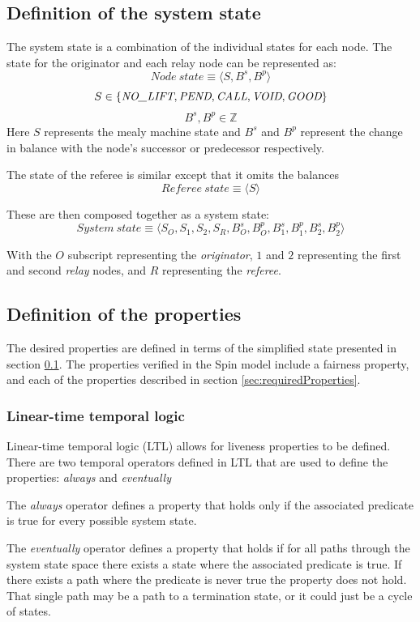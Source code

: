 \documentclass[runningheads]{llncs}
\newcommand{\nolift}{\emph{NO\_LIFT}}
\newcommand{\pend}{\emph{PEND}}
\newcommand{\call}{\emph{CALL}}
\newcommand{\void}{\emph{VOID}}
\newcommand{\good}{\emph{GOOD}}
\begin{document}
\subsection{Definition of the system state}\label{sec:statedef}
The system state is a combination of the individual states for each node. The state for the originator and each relay node can be represented as:
$$Node~state \equiv \langle S, B^s, B^p \rangle$$
$$
S \in \{\nolift, \pend, \call, \void, \good\}
$$
$$
B^s, B^p \in \mathds{Z}
$$
Here $S$ represents the mealy machine state and $B^s$ and $B^p$ represent the change in balance with the node's successor or predecessor respectively.

The state of the referee is similar except that it omits the balances
$$Referee~state \equiv \langle S \rangle$$

These are then composed together as a system state:
$$System~state \equiv \langle S_O, S_1, S_2, S_R, B^s_O, B^p_O, B^s_1, B^p_1, B^s_2, B^p_2  \rangle$$

With the $O$ subscript representing the \emph{originator}, $1$ and $2$ representing the first and second \emph{relay} nodes, and $R$ representing the \emph{referee}.

\subsection{Definition of the properties}
The desired properties are defined in terms of the simplified state presented in section \ref{sec:statedef}. 
The properties verified in the Spin model include a fairness property, and each of the properties described in section \ref{sec:requiredProperties}. 

\subsubsection{Linear-time temporal logic}
Linear-time temporal logic (LTL) allows for liveness properties to be defined. There are two temporal operators defined in LTL that are used to define the properties: \emph{always} and \emph{eventually}

The \emph{always} operator defines a property that holds only if the associated predicate is true for every possible system state.

The \emph{eventually} operator defines a property that holds if for all paths through the system state space there exists a state where the associated predicate is true. If there exists a path where the predicate is never true the property does not hold. That single path may be a path to a termination state, or it could just be a cycle of states. 
\end{document}
